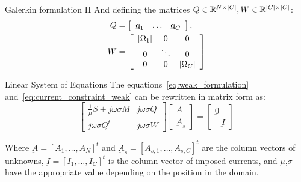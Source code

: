 \documentclass[aspectratio=54,xcolor=dvipsnames]{beamer}
\begin{document}
\begin{frame}{Galerkin formulation II}
    And defining the matrices $Q \in \mathbb{R}^{N \times \abs{C}}, W \in \mathbb{R}^{\abs{C} \times \abs{C}}$:
    \begin{align*}
        Q &= \left[
        \begin{array}{ccc}
            \underbar{q}_1 & \ldots & \underbar{q}_C
        \end{array}
        \right], \\
        W &= \left[
        \begin{array}{ccc}
            \abs{\Omega_1} & 0 & 0 \\
            0 & \ddots & 0 \\
            0 & 0 & \abs{\Omega_C}
        \end{array}
        \right]
    \end{align*}

    \begin{block}{Linear System of Equations}
    The equations~\eqref{eq:weak_formulation} and~\eqref{eq:current_constraint_weak} can be rewritten in matrix form as:
    \begin{equation}
        \left[
        \begin{array}{cc}
            \frac{1}{\mu} S + j\omega \sigma M & j\omega \sigma Q\\
            j\omega \sigma Q^t & j\omega \sigma W 
        \end{array}
        \right]
        \left[
        \begin{array}{c}
            \underbar{A} \\
            \underbar{A}_{s}
        \end{array}
        \right]
        =
        \left[
        \begin{array}{c}
            \underbar{0} \\
            -\underbar{I} 
        \end{array}
        \right]
    \end{equation}
    \end{block}
    Where $\underbar{A} = [A_1, \ldots, A_N]^t$ and $\underbar{A}_s = [A_{s,1}, \ldots, A_{s,C}]^t$ are the column vectors of unknowns, $\underbar{I} = [I_1, \ldots, I_C]^t$ is the column vector of imposed currents, and $\mu$,$\sigma$ have the appropriate value depending on the position in the domain.
\end{frame}
\end{document}
